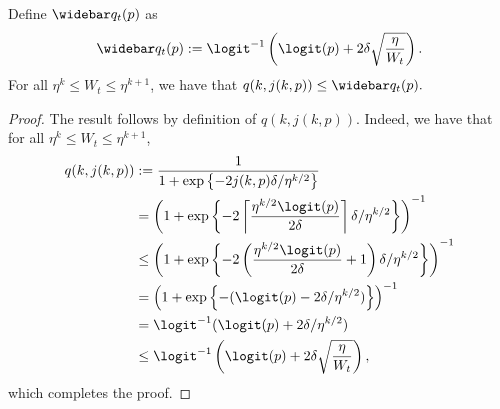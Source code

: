     
    \begin{lemma}\label{lemma:q_kj-upper-bound}
      Define $\widebar q_t(p)$ as
      \begin{equation}
        \widebar q_t(p) := \logit^{-1} \left ( \logit (p) + 2\delta \sqrt{\frac{\eta}{W_t}} \right ).  %
      \end{equation}
      For all $\eta^k \leq W_t \leq \eta^{k+1}$, we have that
      \(
	q(k, j(k,p)) \leq \widebar q_t(p).
      \)
    \end{lemma}
    \begin{proof}
        The result follows by definition of $q(k, j(k,p))$. Indeed, we have that for all $\eta^k \leq W_t \leq \eta^{k+1}$,
        \begin{align*}
            q(k,j(k,p)) &:= \frac{1}{1+\exp \left \{ -2j(k,p)\delta / \eta^{k/2} \right \}}\\
            &= \left (1+\exp \left \{ -2\left \lceil \frac{\eta^{k/2} \logit(p) }{2\delta} \right \rceil\delta / \eta^{k/2} \right \} \right )^{-1} \\
            &\leq \left (1+\exp \left \{ -2 \left ( \frac{\eta^{k/2} \logit(p) }{2\delta} + 1\right )\delta / \eta^{k/2} \right \} \right )^{-1}\\
            &= \left (1+\exp \left \{ -(\logit(p) - 2\delta / \eta^{k/2}) \right \} \right )^{-1} \\
            &= \logit^{-1}(\logit (p) + 2\delta / \eta^{k/2})\\
            &\leq \logit^{-1}\left (\logit (p) + 2\delta \sqrt{\frac{\eta}{W_t}}\right ),
        \end{align*}
        which completes the proof.
    \end{proof}



